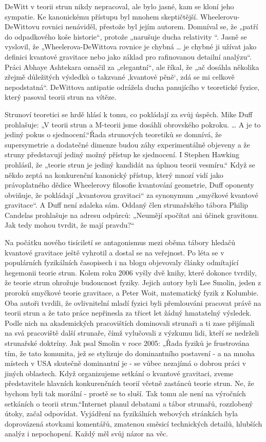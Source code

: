   DeWitt v teorii strun nikdy nepracoval, ale bylo jasné, kam se kloní jeho sympatie. Ke kanonickému
  přístupu byl mnohem skeptičtější. Wheelerovu-DeWittovu rovnici nenáviděl, přestože byl jejím
  autorem. Domníval se, že „patří do odpadkového koše historie“, protože „narušuje ducha relativity
  “. Jasně se vyslovil, že „Wheelerova-DeWittova rovnice je chybná … je chybné ji užívat jako
  definici kvantové gravitace nebo jako základ pro rafinovanou detailní analýzu“. Práci Abhaye
  Ashtekara označil za „elegantní“, ale říkal, že „ač dosáhla několika zřejmě důležitých výsledků o
  takzvané ,kvantové pěně‘, zdá se mi celkově nepodstatná“. DeWittova antipatie odrážela ducha
  panujícího v teoretické fyzice, který pasoval teorii strun na vítěze. 
  
  Strunoví teoretici se hrdě hlásí k tomu, co pokládají za svůj úspěch. Mike Duff prohlašuje: „V
  teorii strun a M-teorii jsme dosáhli obrovského pokroku. … A je to jediný pokus o sjednocení.“Řada
  strunových teoretiků se domnívá, že supersymetrie a dodatečné dimenze budou záhy experimentálně
  objeveny a že struny představují jediný možný přístup ke sjednocení. I Stephen Hawking prohlásil,
  že „teorie strun je jediný kandidát na úplnou teorii vesmíru.“ Když se někdo zeptá na konkurenční
  kanonický přístup, který mnozí vidí jako právoplatného dědice Wheelerovy filosofie kvantování
  geometrie, Duff oponenty obviňuje, že pokládají „kvantovou gravitaci“ za synonymum „smyčkové
  kvantové gravitace“. A Duff není zdaleka sám. Oddaný člen strunařského tábora Philip Candelas
  prohlašuje na adresu odpůrců: „Neumějí spočítat ani účinek gravitonu. Jak tedy mohou tvrdit, že
  mají pravdu?“
  
  Na počátku nového tisíciletí se antagonismus mezi oběma tábory hledačů kvantové gravitace ještě
  vyhrotil a dostal se na veřejnost. Po léta se v populárních fyzikálních časopisech i na blogu
  objevovaly články odmítající hegemonii teorie strun. Kolem roku 2006 vyšly dvě knihy, které
  dokonce tvrdily, že teorie strun ohrožuje budoucnost fyziky. Jejich autory byli Lee Smolin, jeden
  z proroků smyčkové teorie gravitace, a Peter Woit, matematický fyzik z Kolumbie. Oba autoři
  tvrdili, že ovlivnitelní mladí fyzici byli přemlouváni pracovat právě na teorii strun a že tato
  práce nepřinesla za třicet let žádný hmatatelný výsledek. Podle nich na akademických pracovištích
  dominovali strunaři a ti zase přijímali na svá pracoviště další strunaře, čímž vylučovali z
  výzkumu lidi, kteří se nedrželi strunařské doktríny. Jak psal Smolin v roce 2005: „Řada fyziků je
  frustrována tím, že tato komunita, jež se stylizuje do dominantního postavení - a na mnoha místech
  v USA skutečně dominantní je - se vůbec nezajímá o dobrou práci v jiných oblastech. Když
  organizujeme setkání o kvantové gravitaci, zveme představitele hlavních konkurenčních teorií
  včetně zastánců teorie strun. Ne, že bychom byli tak morální - prostě se to sluší. Tak tomu ale
  není na výročních setkáních o teorii strun.“Internet planul debatami a tábor strunařů, rozzlobený
  útoky, začal odpovídat. Vyjádření na fyzikálních webových stránkách byla doprovázená stovkami
  komentářů, zmatenou směsicí technických detailů, hlubších analýz i nepochopení. Každý měl svůj
  názor na věc. 
  
